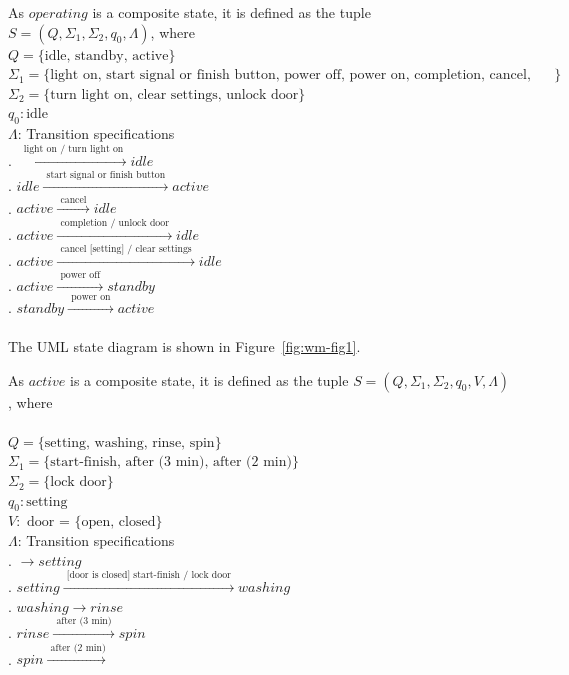 \documentclass[12pt]{article}
\begin{document}
\begin{spacing}{1.5}
\noindent As $operating$ is a composite state, it is defined as the tuple $S = (Q, \Sigma_1, \Sigma_2, q_0, \Lambda)$, where\\
\noindent $Q = \{\text {idle, standby, active}\}$\\
\noindent $\Sigma_1 = \{\text {light on, start signal or finish button, power off, power on, completion, cancel, cancel [setting]}\}$\\ 
\noindent $\Sigma_2 = \{\text {turn light on, clear settings, unlock door}\}$\\
\noindent $q_0: \text{idle}$\\
\noindent $\Lambda$: Transition specifications\\
. $\xrightarrow {\text { light on / turn light on }} idle$\\
. $idle \xrightarrow {\text { start signal or finish button }} active$\\
. $active \xrightarrow {\text { cancel }} idle$\\
. $active \xrightarrow {\text { completion / unlock door }} idle$\\
. $active \xrightarrow {\text { cancel [setting] / clear settings }} idle$\\
. $active \xrightarrow {\text { power off }} standby$\\
. $standby \xrightarrow {\text { power on }} active$\\\\
\noindent The UML state diagram is shown in Figure~\ref{fig:wm-fig1}.\\
\newpage

\noindent As $active$ is a composite state, it is defined as the tuple $S = (Q, \Sigma_1, \Sigma_2, q_0, V, \Lambda)$, where\\\\
\noindent $Q = \{\text {setting, washing, rinse, spin}\}$\\
\noindent $\Sigma_1 = \{\text {start-finish, after (3 min), after (2 min)}\}$\\ 
\noindent $\Sigma_2 = \{\text {lock door}\}$\\
\noindent $q_0: \text{setting}$\\
\noindent $V: \text{ door = \{open, closed\} }$\\
\noindent $\Lambda$: Transition specifications\\
. $\xrightarrow {} setting$\\
. $setting \xrightarrow {\text { [door is closed] start-finish / lock door }} washing $\\
. $washing \xrightarrow {} rinse$\\
. $rinse \xrightarrow {\text { after (3 min) }} spin$\\
. $spin  \xrightarrow {\text { after (2 min)}}$\\


\end{spacing}
\end{document}
